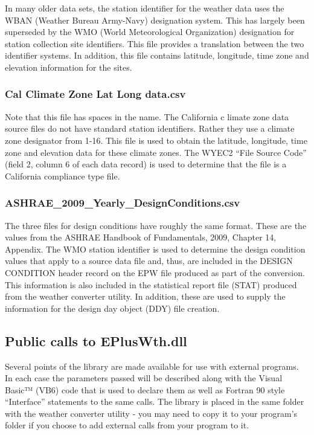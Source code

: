 In many older data sets, the station identifier for the weather data uses the WBAN (Weather Bureau Army-Navy) designation system. This has largely been superseded by the WMO (World Meteorological Organization) designation for station collection site identifiers. This file provides a translation between the two identifier systems. In addition, this file contains latitude, longitude, time zone and elevation information for the sites.

\subsubsection{Cal Climate Zone Lat Long data.csv}\label{cal-climate-zone-lat-long-data.csv}

Note that this file has spaces in the name. The California c limate zone data source files do not have standard station identifiers. Rather they use a climate zone designator from 1-16. This file is used to obtain the latitude, longitude, time zone and elevation data for these climate zones. The WYEC2 ``File Source Code'' (field 2, column 6 of each data record) is used to determine that the file is a California compliance type file.

\subsubsection{ASHRAE\_2009\_Yearly\_DesignConditions.csv}\label{ashraeux5f2009ux5fyearlyux5fdesignconditions.csv}

The three files for design conditions have roughly the same format. These are the values from the ASHRAE Handbook of Fundamentals, 2009, Chapter 14, Appendix. The WMO station identifier is used to determine the design condition values that apply to a source data file and, thus, are included in the DESIGN CONDITION header record on the EPW file produced as part of the conversion. This information is also included in the statistical report file (STAT) produced from the weather converter utility. In addition, these are used to supply the information for the design day object (DDY) file creation.

\subsection{Public calls to EPlusWth.dll}\label{public-calls-to-epluswth.dll}

Several points of the library are made available for use with external programs. In each case the parameters passed will be described along with the Visual Basic™ (VB6) code that is used to declare them as well as Fortran 90 style ``Interface'' statements to the same calls. The library is placed in the same folder with the weather converter utility - you may need to copy it to your program's folder if you choose to add external calls from your program to it.

